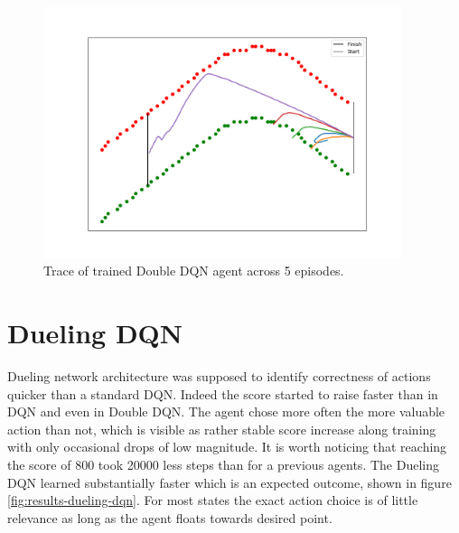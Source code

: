 \begin{figure}[h]
    \centering
    \includegraphics[width=10.5cm]{img/trace_ddqn.png}
    \caption{Trace of trained Double DQN agent across 5 episodes.}
    \label{fig:trace-ddqn}
\end{figure}

\newpage

\section{Dueling DQN}
\label{sec:results-dueling-dqn}

Dueling network architecture was supposed to identify correctness of actions quicker than a standard DQN. Indeed the score started to raise faster
than in DQN and even in Double DQN. The agent chose more often the more valuable action than not, which is visible as rather stable score increase
along training with only occasional drops of low magnitude. It is worth noticing that reaching the score of 800 took 20000 less steps than for a
previous agents. The Dueling DQN learned substantially faster which is an expected outcome, shown in figure \ref{fig:results-dueling-dqn}. For most states the exact action choice is of little
relevance as long as the agent floats towards desired point.

